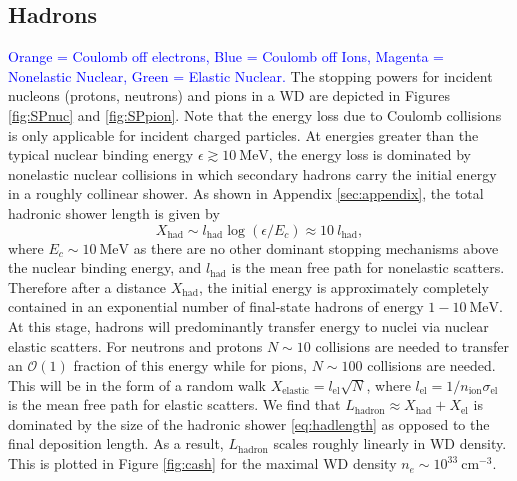 \documentclass[twocolumn,showpacs,preprintnumbers,amsmath,amssymb,prd]{revtex4}
\newcommand{\OO}{\mathcal{O}}
\begin{document}
\subsection{Hadrons}
\textcolor{blue}{Orange = Coulomb off electrons, Blue = Coulomb off Ions, Magenta = Nonelastic Nuclear, Green = Elastic Nuclear.}
The stopping powers for incident nucleons (protons, neutrons) and pions in a WD are depicted in Figures \ref{fig:SPnuc} and \ref{fig:SPpion}. Note that the energy loss due to Coulomb collisions is only applicable for incident charged particles. At energies greater than the typical nuclear binding energy $\epsilon \gtrsim 10 ~\text{MeV}$, the energy loss is dominated by nonelastic nuclear collisions in which secondary hadrons carry the initial energy in a roughly collinear shower. As shown in Appendix \ref{sec:appendix}, the total hadronic shower length is given by
\begin{equation}
X_{\text{had}} \sim l_\text{had} \log{(\epsilon/E_c)} \approx 10 ~l_\text{had},
\label{eq:hadlength}
\end{equation}
where $E_c \sim 10 ~\text{MeV}$ as there are no other dominant stopping mechanisms above the nuclear binding energy, and $l_\text{had}$ is the mean free path for nonelastic scatters. Therefore after a distance $X_\text{had}$, the initial energy is approximately completely contained in an exponential number of final-state hadrons of energy $1 - 10 ~\text{MeV}$. At this stage, hadrons will predominantly transfer energy to nuclei via nuclear elastic scatters. For neutrons and protons $N \sim 10$ collisions are needed to transfer an $\OO(1)$ fraction of this energy while for pions, $N \sim 100$ collisions are needed. This will be in the form of a random walk $X_\text{elastic} = l_\text{el} \sqrt{N}$, where $ l_\text{el} = 1/n_\text{ion} \sigma_\text{el}$ is the mean free path for elastic scatters. We find that $L_\text{hadron} \approx X_\text{had} + X_\text{el}$ is dominated by the size of the hadronic shower \eqref{eq:hadlength} as opposed to the final deposition length. As a result, $L_\text{hadron}$ scales roughly linearly in WD density. This is plotted in Figure \ref{fig:cash} for the maximal WD density $n_e \sim 10^{33} ~\text{cm}^{-3}$.
\end{document}
